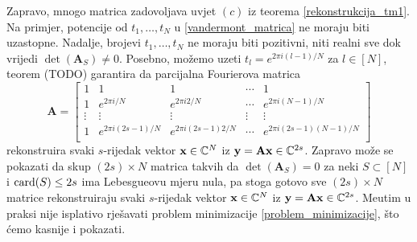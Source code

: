 \documentclass[a4paper,twoside,12pt]{memoir} %
\newcommand{\vect}[1]{\mathbf{#1}}
\renewcommand{\vec}{\vect}
\newcommand{\card}{\text{\normalfont{card}}}
\begin{document}
\indent Zapravo, mnogo matrica zadovoljava uvjet $(c)$ iz teorema \eqref{rekonstrukcija_tm1}. Na primjer, potencije od $t_1,\dots,t_N$ u \eqref{vandermont_matrica} ne moraju biti uzastopne. Nadalje, brojevi $t_1,\dots,t_N$ ne moraju biti pozitivni, niti realni sve dok vrijedi $\det(\vec A_S) \neq 0$. Posebno, mo\v{z}emo uzeti $t_l = e^{2\pi i (l-1)/N}$ za $l \in [N]$, teorem (TODO) garantira da parcijalna Fourierova matrica
\begin{equation*}
   \vec A = 
   \begin{bmatrix*}
       1 & 1 & 1 & \cdots & 1 \\
       1 & e^{2 \pi i/ N} & e^{2 \pi i2/ N} & \cdots & e^{2 \pi i(N-1)/ N} \\ 
       \vdots & \vdots & \vdots & \vdots & \vdots \\ 
       1 & e^{2 \pi i(2s-1)/ N} & e^{2 \pi i(2s-1)2/ N} & \cdots & e^{2 \pi i(2s-1)(N-1)/ N} \\ 
   \end{bmatrix*}
\end{equation*}
rekonstruira svaki $s$-rijedak vektor $\vec x \in \C^N$ iz $\vec y = \vec{Ax} \in \C^{2s}$.
Zapravo mo\v{z}e se pokazati da skup $(2s) \times N$ matrica takvih da $\det(\vec A_S) = 0$ za neki $S \subset [N]$ i $\card(S) \leq 2s$ ima Lebesgueovu mjeru nula, pa stoga gotovo sve $(2s) \times N$ matrice rekonstruiraju svaki $s$-rijedak vektor $\vec x \in \C^N$ iz $\vec y = \vec{Ax} \in \C^{2s}$. Me\dj utim u praksi nije isplativo rje\v{s}avati problem minimizacije \eqref{problem_minimizacije}, \v{s}to \'cemo kasnije i pokazati.
\end{document}
